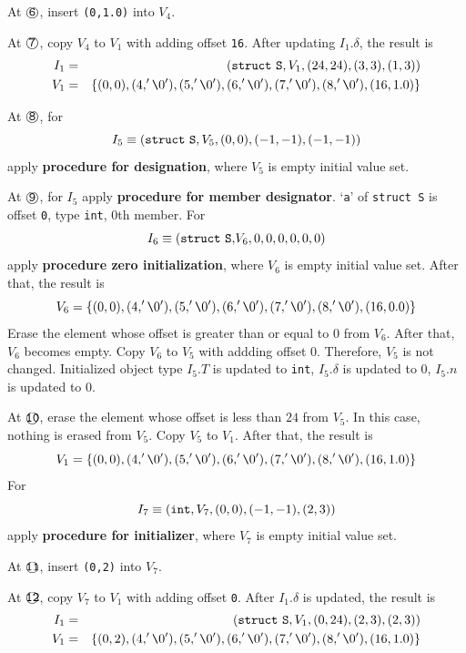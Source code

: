\begin{Example}
\noindent
At $\MARU{\tt 6}$, insert {\tt (0,1.0)} into $V_4$.

\noindent
At $\MARU{\tt 7}$,
copy $V_4$ to $V_1$ with adding offset {\tt{16}}.
After updating $I_1.\delta$, the result is
\begin{eqnarray*}
I_1 & = & ({\tt{struct\,\,S}},V_1,(24,24),(3,3),(1,3))  \\
V_1 & = & \{ (0,0), (4,'\verb|\|0'), (5,'\verb|\|0'), (6,'\verb|\|0'),
        (7,'\verb|\|0'), (8,'\verb|\|0'), (16,1.0)    \}
\end{eqnarray*}

\noindent
At $\MARU{\tt 8}$, for
\[
I_5 \equiv ({\tt struct\,\,S}, V_5, (0,0), (-1,-1),(-1,-1))
\]
apply
{\bf procedure for designation}, where $V_5$ is empty initial value set.

\noindent
At $\MARU{\tt 9}$, for $I_5$ apply
{\bf procedure for member designator}.
`{\tt a}' of {\tt struct S} is offset {\tt{0}}, 
type {\tt int}, $0$th member.
For
\[
 I_6 \equiv ({\tt{struct\,\,S},}V_6,0,0,0,0,0,0)
\]
apply {\bf procedure zero initialization}, where $V_6$ is empty initial
 value set.
After that, the result is
\[
V_6 = \{ (0,0), (4,'\verb|\|0'), (5,'\verb|\|0'), (6,'\verb|\|0'),
           (7,'\verb|\|0'), (8,'\verb|\|0'), (16,0.0)    \}
\]
Erase the element whose offset is greater than or equal to $0$ from
 $V_6$. After that, $V_6$ becomes empty.
Copy $V_6$ to $V_5$ with addding offset $0$.
Therefore, $V_5$ is not changed.
Initialized object type $I_5.T$ is updated to {\tt{int}},
$I_5.{\delta}$ is updated to $0$,
$I_5.n$ is updated to $0$.

\noindent
At $\MARU{\tt 10}$, erase the element whose offset is less than $24$
 from $V_5$. In this case, nothing is erased from $V_5$.
Copy $V_5$ to $V_1$. After that, the result is
\[
V_1 = \{ (0,0), (4,'\verb|\|0'), (5,'\verb|\|0'), (6,'\verb|\|0'),
        (7,'\verb|\|0'), (8,'\verb|\|0'), (16,1.0)    \}
\]
For
\[
I_7 \equiv ({\tt{int}}, V_7, (0,0), (-1,-1), (2,3))
\]
apply {\bf procedure for initializer}, where $V_7$ is empty initial
 value set.

\noindent
At $\MARU{\tt 11}$, insert {\tt (0,2)} into $V_7$.

\noindent
At $\MARU{\tt 12}$,
copy $V_7$ to $V_1$ with adding offset {\tt{0}}.
After $I_1.\delta$ is updated, the result is
\begin{eqnarray*}
I_1 & = & ({\tt{struct\,\,S}},V_1,(0,24),(2,3),(2,3))  \\
V_1 & = & \{ (0,2), (4,'\verb|\|0'), (5,'\verb|\|0'), (6,'\verb|\|0'),
        (7,'\verb|\|0'), (8,'\verb|\|0'), (16,1.0)    \}
\end{eqnarray*}


\end{Example}
